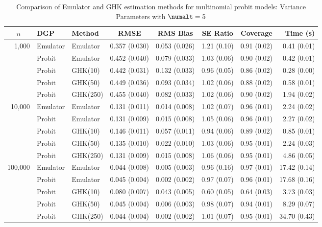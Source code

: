 \begin{table}[htbp]
\centering
\footnotesize
\begin{tabular}{@{}rllrrrrr@{}}
\toprule
\multicolumn{1}{c}{$n$} & \multicolumn{1}{l}{DGP} & \multicolumn{1}{l}{Method} & \multicolumn{1}{c}{RMSE} & \multicolumn{1}{c}{RMS Bias} & \multicolumn{1}{c}{SE Ratio} & \multicolumn{1}{c}{Coverage} & \multicolumn{1}{r}{Time (s)} \\
\midrule
\multirow{5}{*}{1,000} & Emulator & Emulator & 0.357 (0.030) & 0.053 (0.026) & 1.21 (0.10) & 0.91 (0.02) & 0.41 (0.01) \\
 & Probit & Emulator & 0.452 (0.040) & 0.079 (0.033) & 1.03 (0.06) & 0.90 (0.02) & 0.42 (0.01) \\
 & Probit & GHK(10) & 0.442 (0.031) & 0.132 (0.033) & 0.96 (0.05) & 0.86 (0.02) & 0.28 (0.00) \\
 & Probit & GHK(50) & 0.449 (0.036) & 0.093 (0.034) & 1.02 (0.06) & 0.88 (0.02) & 0.58 (0.01) \\
 & Probit & GHK(250) & 0.455 (0.040) & 0.082 (0.033) & 1.02 (0.06) & 0.90 (0.02) & 1.94 (0.02) \\
\midrule
\multirow{5}{*}{10,000} & Emulator & Emulator & 0.131 (0.011) & 0.014 (0.008) & 1.02 (0.07) & 0.96 (0.01) & 2.24 (0.02) \\
 & Probit & Emulator & 0.131 (0.009) & 0.015 (0.008) & 1.05 (0.06) & 0.96 (0.01) & 2.27 (0.02) \\
 & Probit & GHK(10) & 0.146 (0.011) & 0.057 (0.011) & 0.94 (0.06) & 0.89 (0.02) & 0.85 (0.01) \\
 & Probit & GHK(50) & 0.135 (0.010) & 0.022 (0.010) & 1.03 (0.06) & 0.95 (0.01) & 2.24 (0.03) \\
 & Probit & GHK(250) & 0.131 (0.009) & 0.015 (0.008) & 1.06 (0.06) & 0.95 (0.01) & 4.86 (0.05) \\
\midrule
\multirow{5}{*}{100,000} & Emulator & Emulator & 0.044 (0.008) & 0.005 (0.003) & 0.96 (0.16) & 0.97 (0.01) & 17.42 (0.14) \\
 & Probit & Emulator & 0.045 (0.004) & 0.002 (0.002) & 0.97 (0.07) & 0.96 (0.01) & 17.68 (0.16) \\
 & Probit & GHK(10) & 0.080 (0.007) & 0.043 (0.005) & 0.60 (0.05) & 0.64 (0.03) & 3.73 (0.03) \\
 & Probit & GHK(50) & 0.045 (0.004) & 0.006 (0.003) & 0.98 (0.07) & 0.94 (0.01) & 8.29 (0.07) \\
 & Probit & GHK(250) & 0.044 (0.004) & 0.002 (0.002) & 1.01 (0.07) & 0.95 (0.01) & 34.70 (0.43) \\
\bottomrule
\end{tabular}
\caption{Comparison of Emulator and GHK estimation methods for multinomial probit models: Variance Parameters with $\numalt=5$}
\label{tab:emulator_vs_ghk:5:variance}
\end{table}